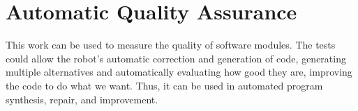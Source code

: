 \section{Automatic Quality Assurance}
\label{sec:autquaass}

This work can be used to measure the quality of software modules. The tests could allow the robot's automatic correction and generation of code, generating multiple alternatives and automatically evaluating how good they are, improving the code to do what we want. Thus, it can be used in automated program synthesis, repair, and improvement.
